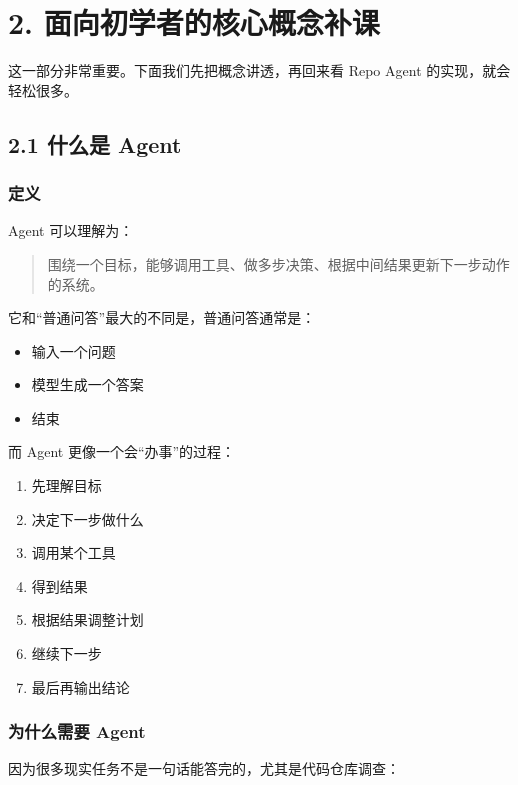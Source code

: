 \documentclass[UTF8,12pt,openany]{ctexbook}
\begin{document}
\section{2. 面向初学者的核心概念补课}

这一部分非常重要。下面我们先把概念讲透，再回来看 Repo Agent 的实现，就会轻松很多。\par

\subsection{2.1 什么是 Agent}

\subsubsection{定义}

Agent 可以理解为：\par

\begin{quote}
围绕一个目标，能够调用工具、做多步决策、根据中间结果更新下一步动作的系统。
\end{quote}

它和“普通问答”最大的不同是，普通问答通常是：\par

\begin{itemize}
\item 输入一个问题
\item 模型生成一个答案
\item 结束
\end{itemize}

而 Agent 更像一个会“办事”的过程：\par

\begin{enumerate}
\item 先理解目标
\item 决定下一步做什么
\item 调用某个工具
\item 得到结果
\item 根据结果调整计划
\item 继续下一步
\item 最后再输出结论
\end{enumerate}

\subsubsection{为什么需要 Agent}

因为很多现实任务不是一句话能答完的，尤其是代码仓库调查：\par
\end{document}
